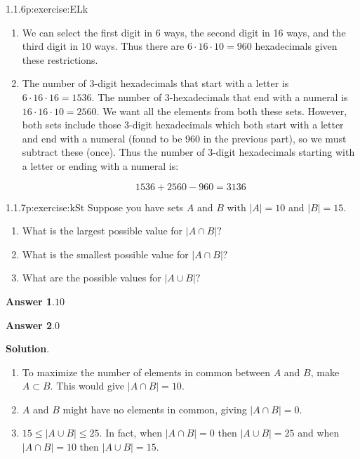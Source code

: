 \documentclass[twoside,11pt,]{book}
\newcommand{\blocktitlefont}{\relax}
\numberwithin{equation}{chapter}
\newcommand{\card}[1]{\left| #1 \right|}
\begin{document}
\begin{divisionsolution}{1.1.6}{}{p:exercise:ELk}
\begin{enumerate}[label=(\alph*)]
\item{}We can select the first digit in 6 ways, the second digit in 16 ways, and the third digit in 10 ways. Thus there are \(6\cdot 16 \cdot 10 = 960\) hexadecimals given these restrictions.%
\item{}The number of 3-digit hexadecimals that start with a letter is \(6 \cdot 16 \cdot 16 = 1536\text{.}\) The number of 3-hexadecimals that end with a numeral is \(16 \cdot 16 \cdot 10 = 2560\text{.}\) We want all the elements from both these sets. However, both sets include those 3-digit hexadecimals which both start with a letter and end with a numeral (found to be 960 in the previous part), so we must subtract these (once). Thus the number of 3-digit hexadecimals starting with a letter or ending with a numeral is:%
\par
%
\begin{equation*}
1536 + 2560 - 960 = 3136
\end{equation*}
%
\end{enumerate}
%
\end{divisionsolution}%
\begin{divisionsolution}{1.1.7}{}{p:exercise:kSt}%
Suppose you have sets \(A\) and \(B\) with \(\card{A} = 10\) and \(\card{B} = 15\text{.}\)%
\begin{enumerate}[label=(\alph*)]
\item{}What is the largest possible value for \(\card{A \cap B}\text{?}\)%
\item{}What is the smallest possible value for \(\card{A \cap B}\text{?}\)%
\item{}What are the possible values for \(\card{A \cup B}\text{?}\)%
\end{enumerate}
%
\par\smallskip%
\noindent\textbf{\blocktitlefont Answer 1}.\quad{}\(10\)%
\par\smallskip%
\noindent\textbf{\blocktitlefont Answer 2}.\quad{}\(0\)%
\par\smallskip%
\noindent\textbf{\blocktitlefont Solution}.\quad{}%
\begin{enumerate}[label=(\alph*)]
\item{}To maximize the number of elements in common between \(A\) and \(B\text{,}\) make \(A \subset B\text{.}\) This would give \(\card{A \cap B} = 10\text{.}\)%
\item{}\(A\) and \(B\) might have no elements in common, giving \(\card{A\cap B} = 0\text{.}\)%
\item{}\(15 \le \card{A \cup B} \le 25\text{.}\) In fact, when \(\card{A \cap B} = 0\) then \(\card{A \cup B} = 25\) and when \(\card{A \cap B} = 10\) then \(\card{A \cup B} = 15\text{.}\)%
\end{enumerate}
%
\end{divisionsolution}%
\end{document}
